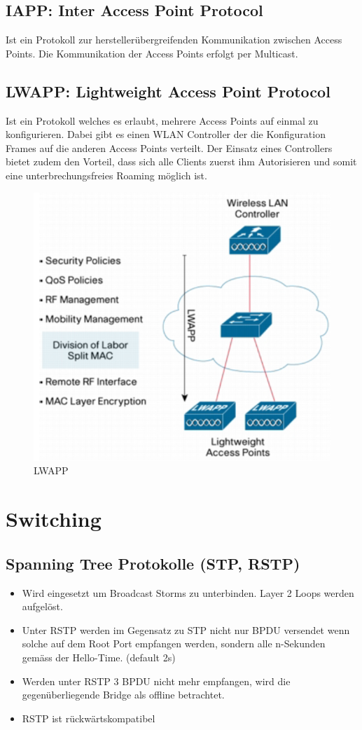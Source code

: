 \subsection{IAPP: Inter Access Point Protocol}
Ist ein Protokoll zur herstellerübergreifenden Kommunikation zwischen Access Points. Die Kommunikation der Access Points erfolgt per Multicast.
	
\subsection{LWAPP: Lightweight Access Point Protocol}
Ist ein Protokoll welches es erlaubt, mehrere Access Points auf einmal zu konfigurieren. Dabei gibt es einen WLAN Controller der die Konfiguration Frames auf die anderen Access Points verteilt. Der Einsatz eines Controllers bietet zudem den Vorteil, dass sich alle Clients zuerst ihm Autorisieren und somit eine unterbrechungsfreies Roaming möglich ist.

\begin{figure}
\centering
\includegraphics[width=0.5\linewidth]{images/lwapp}
\caption{LWAPP}
\end{figure}

		
\section{Switching}	
\subsection{Spanning Tree Protokolle (STP, RSTP)}
\begin{itemize}
	\item Wird eingesetzt um Broadcast Storms zu unterbinden. Layer 2 Loops werden aufgelöst.
	\item Unter RSTP werden im Gegensatz zu STP nicht nur BPDU versendet wenn solche auf dem Root Port empfangen werden, sondern alle n-Sekunden gemäss der Hello-Time. (default 2s)
	\item Werden unter RSTP 3 BPDU nicht mehr empfangen, wird die gegenüberliegende Bridge als offline betrachtet.
	\item RSTP ist rückwärtskompatibel
\end{itemize}
